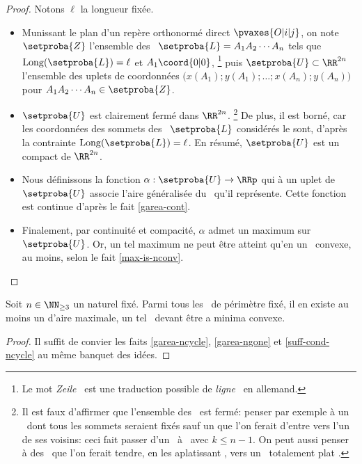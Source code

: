 \begin{proof}
	Notons $\ell$ la longueur fixée.
    \begin{itemize}
        \item Munissant le plan d'un repère orthonormé direct $\pvaxes{O | i | j}$, on note $\setproba{Z}$ l'ensemble des \ncycles\ $\setproba{L} = A_1 A_2 \cdots A_n$ tels que
        $\perim{\setproba{L}} = \ell$
        et
        $A_1\coord{0 | 0}$,%
        \footnote{
        	Le mot \og \emph{Zeile} \fg\ est une traduction possible de \og \emph{ligne} \fg\ en allemand.
        }
        puis $\setproba{U} \subset \RR^{2n}$ l'ensemble des uplets de coordonnées $\big( x(A_1) ; y(A_1) ; \dots ; x(A_n) ; y(A_n) \big)$ pour $A_1 A_2 \cdots A_n \in \setproba{Z}$.


        \item $\setproba{U}$ est clairement fermé dans $\RR^{2n}$.%
        \footnote{
        	Il est faux d'affirmer que l'ensemble des \ngones\ est fermé: penser par exemple à un \ngone\ dont tous les sommets seraient fixés sauf un que l'on ferait d'entre vers l'un de ses voisins: ceci fait passer d'un \ngone\ à \kgone\ avec $k \leq n-1$.
	        On peut aussi penser à des \ngones\ que l'on ferait tendre, en les \og aplatissant \fg, vers un \ncycle\ totalement \og plat \fg.
        }
        De plus, il est borné, car les coordonnées des sommets des \ncycles\ $\setproba{L}$ considérés le sont, d'après la contrainte $\perim{\setproba{L}} = \ell$.
        En résumé, $\setproba{U}$ est un compact de $\RR^{2n}$.


        \item Nous définissons la fonction $\alpha: \setproba{U} \rightarrow \RRp$ qui à un uplet de $\setproba{U}$ associe l'aire généralisée du \ncycle\ qu'il représente.
        Cette fonction est continue d'après le fait \ref{garea-cont}.


        \item Finalement, par continuité et compacité, $\alpha$ admet un maximum sur $\setproba{U}$.
        Or, un tel maximum ne peut être atteint qu'en un \ngone\ convexe, au moins, selon le fait \ref{max-is-nconv}.
    \end{itemize}
    
    \null\vspace{-6ex}
\end{proof}




\begin{fact} \label{suff-cond}
    Soit $n \in \NN_{\geq3}$ un naturel fixé.
    Parmi tous les \ngones\ de périmètre fixé, il en existe au moins un d'aire maximale, un tel \ngone\ devant être a minima convexe.
\end{fact}


\begin{proof}
    Il suffit de convier les faits \ref{garea-ncycle}, \ref{garea-ngone} et \ref{suff-cond-ncycle} au même banquet des idées.
\end{proof}

